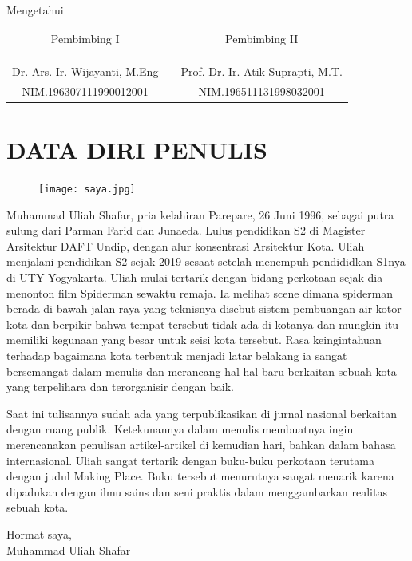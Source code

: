 \documentclass[12pt,oneside]{udthesis}\usepackage[]{graphicx}\usepackage[]{color}
\def \yourAdvisor{Dr. Ars. Ir. Wijayanti, M.Eng}
\def \yourNipAdvisor{196307111990012001}
\def \yourSecAdvisor{Prof. Dr. Ir. Atik Suprapti,  M.T.}
\def \yourNipSecAdvisor{196511131998032001}
\begin{document}
\begin{center}
\vspace{\baselineskip}
Mengetahui

\begin{tabular}{@{}ccc@{}}
Pembimbing I	 & & Pembimbing II\\
	 & & \\
	 & & \\
	 & & \\
\yourAdvisor & & \yourSecAdvisor \\

NIM.\yourNipAdvisor & & NIM.\yourNipSecAdvisor \\
\end{tabular}
\end{center}



\chapter*{DATA DIRI PENULIS}

\begin{figure}
\centering
    \texttt{[image: saya.jpg]}
\end{figure}

\noindent Muhammad Uliah Shafar, pria kelahiran Parepare, 26 Juni 1996, sebagai putra sulung dari Parman Farid dan Junaeda. Lulus pendidikan S2 di Magister Arsitektur DAFT Undip, dengan alur konsentrasi Arsitektur Kota. Uliah menjalani pendidikan S2 sejak 2019 sesaat setelah menempuh pendididkan S1nya di UTY Yogyakarta.
Uliah mulai tertarik dengan bidang perkotaan sejak dia menonton film Spiderman sewaktu remaja. Ia melihat scene dimana spiderman berada di bawah jalan raya yang teknisnya disebut sistem pembuangan air kotor kota dan berpikir bahwa tempat tersebut tidak ada di kotanya dan mungkin itu memiliki kegunaan yang besar untuk seisi kota tersebut. Rasa keingintahuan terhadap bagaimana kota terbentuk menjadi latar belakang ia sangat bersemangat dalam menulis dan merancang hal-hal baru berkaitan sebuah kota yang terpelihara dan terorganisir dengan baik.

Saat ini tulisannya sudah ada yang terpublikasikan di jurnal nasional berkaitan dengan ruang publik. Ketekunannya dalam menulis membuatnya ingin merencanakan penulisan artikel-artikel di kemudian hari, bahkan dalam bahasa internasional. Uliah sangat tertarik dengan buku-buku perkotaan terutama dengan judul Making Place. Buku tersebut menurutnya sangat menarik karena dipadukan dengan ilmu sains dan seni praktis dalam menggambarkan realitas sebuah kota.

\vspace{2\baselineskip}
\begin{flushright}
    Hormat saya,\\ Muhammad Uliah Shafar
\end{flushright}



\end{document}
